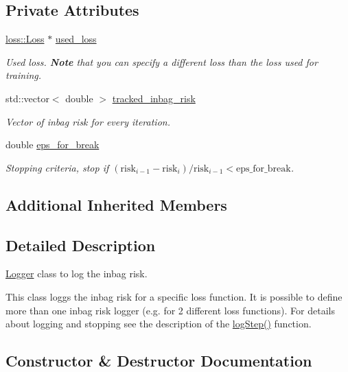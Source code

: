 \subsection*{Private Attributes}
\begin{DoxyCompactItemize}
\item 
\hyperlink{classloss_1_1_loss}{loss\+::\+Loss} $\ast$ \hyperlink{classlogger_1_1_logger_inbag_risk_abd70a6ddb6701bab59cd3ac01468938b}{used\+\_\+loss}
\begin{DoxyCompactList}\small\item\em Used loss. {\bfseries Note} that you can specify a different loss than the loss used for training. \end{DoxyCompactList}\item 
std\+::vector$<$ double $>$ \hyperlink{classlogger_1_1_logger_inbag_risk_a823c1a3de2cc47d8fca047297d374590}{tracked\+\_\+inbag\+\_\+risk}
\begin{DoxyCompactList}\small\item\em Vector of inbag risk for every iteration. \end{DoxyCompactList}\item 
double \hyperlink{classlogger_1_1_logger_inbag_risk_a2990493d573d8e57605e4d96e0c0d8bb}{eps\+\_\+for\+\_\+break}
\begin{DoxyCompactList}\small\item\em Stopping criteria, stop if $(\mathrm{risk}_{i-1} - \mathrm{risk}_i) / \mathrm{risk}_{i-1} < \mathrm{eps\_for\_break}$. \end{DoxyCompactList}\end{DoxyCompactItemize}
\subsection*{Additional Inherited Members}


\subsection{Detailed Description}
\hyperlink{classlogger_1_1_logger}{Logger} class to log the inbag risk. 

This class loggs the inbag risk for a specific loss function. It is possible to define more than one inbag risk logger (e.\+g. for 2 different loss functions). For details about logging and stopping see the description of the {\ttfamily \hyperlink{classlogger_1_1_logger_inbag_risk_aa7cb90600de663c51feaaf8a0715a0f9}{log\+Step()}} function. 

\subsection{Constructor \& Destructor Documentation}
\mbox{\label{classlogger_1_1_logger_inbag_risk_ad6aa28d3140dc547f051a3ccd0cde43d}} 

